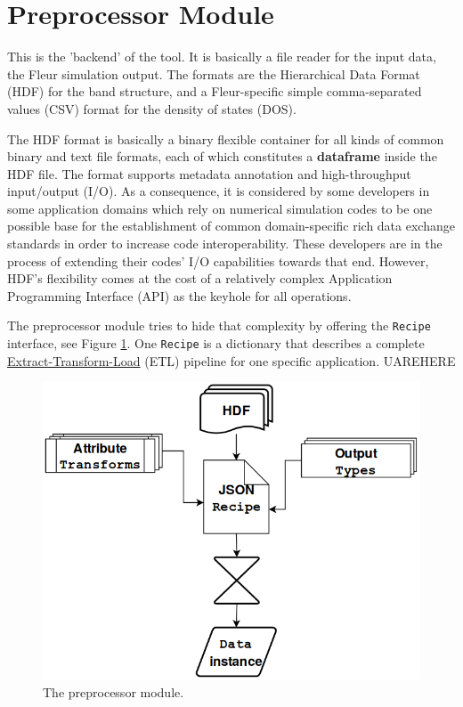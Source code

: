\section{Preprocessor Module}
\label{sec:preprocessor-module}

This is the 'backend' of the tool. It is basically a file reader for the input
data, the Fleur simulation output. The formats are the Hierarchical Data Format
(HDF) \cite{hdf} for the band structure, and a Fleur-specific simple
comma-separated values (CSV) format for the density of states (DOS).

The HDF format is basically a binary flexible container for all kinds of common
binary and text file formats, each of which constitutes a \textbf{dataframe}
inside the HDF file. The format supports metadata annotation and high-throughput
input/output (I/O). As a consequence, it is considered by some developers in
some application domains which rely on numerical simulation codes to be one
possible base for the establishment of common domain-specific rich data exchange
standards in order to increase code interoperability. These developers are in
the process of extending their codes' I/O capabilities towards that end.
However, HDF's flexibility comes at the cost of a relatively complex Application
Programming Interface (API) as the keyhole for all operations.

The preprocessor module tries to hide that complexity by offering the
\texttt{Recipe} interface, see Figure \ref{fig:preprocessor}. One
\texttt{Recipe} is a dictionary that describes a complete
\href{https://en.wikipedia.org/wiki/Extract,_transform,_load}{Extract-Transform-Load}
(ETL) pipeline for one specific application. UAREHERE

\begin{figure}[htb!]
    \centering
    \includegraphics[width=0.6\linewidth]{img/reader_flowchart4.png}
    \caption{The preprocessor module.}
    \label{fig:preprocessor}
\end{figure}

